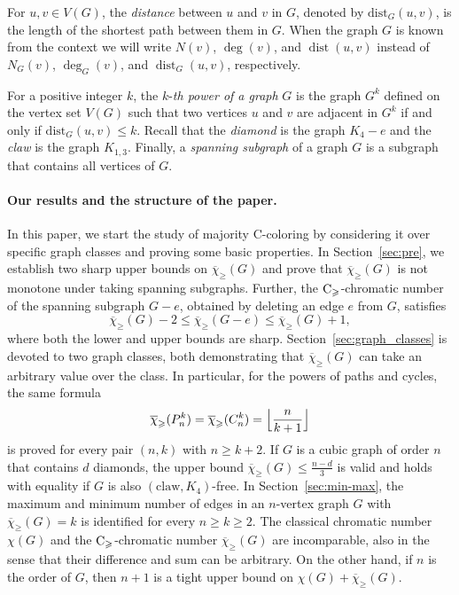 \documentclass{article}
\theoremstyle{definition}
\newcommand{\mc}{\overline{\chi}_{\geqslant}}
\newcommand{\cg}{{\rm C}_{\geqslant}}
\DeclareMathOperator{\dist}{dist}
\begin{document}
For $u,v\in V(G)$, the {\it distance} between $u$ and $v$ in $G$, denoted by $\mathrm{dist}_{G}(u,v)$, is the length of the shortest path between them in $G$. When the graph $G$ is known from the context we will write $N(v)$, $\deg(v)$, and $\dist(u,v)$ instead of $N_G(v)$, $\deg_G(v)$, and $\dist_G(u,v)$, respectively. 

For a positive integer $k$, the $k$-{\it th power of a graph} $G$ is the graph $G^{k}$
defined on the vertex set $V(G)$ such that two vertices $u$ and $v$ are adjacent in $G^{k}$
if and only if $\mathrm{dist}_{G}(u,v)\le k$. Recall that the \emph{diamond} is the graph  $K_4-e$ and  the \emph{claw} is the graph $K_{1,3}$.
Finally, a {\it spanning subgraph} of a graph $G$ is a subgraph that contains all vertices of $G$.



\paragraph{Our results and the structure of the paper.} 
In this paper, we start the study of majority C-coloring by considering it over specific graph classes and proving some basic properties. In Section~\ref{sec:pre}, we establish two sharp upper bounds on $\mc(G)$ and prove that $\mc(G)$ is not monotone under taking spanning subgraphs. Further, the $\cg$-chromatic number of the spanning subgraph $G-e$, obtained by deleting an edge $e$ from $G$, satisfies 
\begin{equation*}
        \mc(G)-2 \leq \mc(G-e) \leq \mc(G) +1,
        \label{ineq:del_edge}
    \end{equation*} 
    where both the lower and upper bounds are sharp.
    Section~\ref{sec:graph_classes} is devoted to two graph classes, both demonstrating that $\mc(G)$ can take an arbitrary value over the class. 
    In particular, for the powers of paths and cycles, the same formula $$\mc(P_n^k)=\mc(C_n^k)= \Bigl\lfloor \frac{n}{k+1} \Bigr\rfloor$$
    is proved for every pair $(n,k)$ with $n \ge k+2$. If $G$ is a cubic graph of order $n$ that contains $d$ diamonds, the upper bound $\mc(G) \leq \frac{n-d}{3}$ is valid and holds with equality if $G$ is also $(\mbox{claw}, K_4)$-free. In Section~\ref{sec:min-max}, the maximum and minimum number of edges in an $n$-vertex graph $G$ with $\mc(G)=k$ is identified for every $n \ge k \ge 2$. The classical chromatic number $\chi(G)$ and the $\cg$-chromatic number $\mc(G)$ are incomparable, also in the sense that their difference and sum can be arbitrary. On the other hand, if $n$ is the order of $G$, then
    $n+1$ is a tight upper bound on  $\chi(G)+\mc(G)$.
\end{document}
